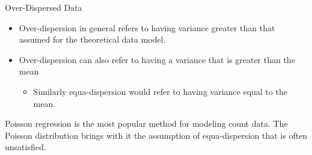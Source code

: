 \documentclass[
  ignorenonframetext,
]{beamer}
\providecommand{\tightlist}{%
  \setlength{\itemsep}{0pt}\setlength{\parskip}{0pt}}\usepackage{longtable,booktabs,array}
\begin{document}
\begin{frame}{Over-Dispersed Data}
\protect\hypertarget{over-dispersed-data}{}
\begin{itemize}
\tightlist
\item
  Over-dispersion in general refers to having variance greater than that
  assumed for the theoretical data model.\\
\item
  Over-dispersion can also refer to having a variance that is greater
  than the mean

  \begin{itemize}
  \tightlist
  \item
    Similarly equa-dispersion would refer to having variance equal to
    the mean.
  \end{itemize}
\end{itemize}

\begin{tcolorbox}[enhanced jigsaw, colbacktitle=quarto-callout-note-color!10!white, breakable, arc=.35mm, leftrule=.75mm, opacitybacktitle=0.6, titlerule=0mm, colframe=quarto-callout-note-color-frame, toptitle=1mm, left=2mm, bottomrule=.15mm, toprule=.15mm, coltitle=black, bottomtitle=1mm, title={Poisson regression}, rightrule=.15mm, opacityback=0, colback=white]

Poisson regression is the most popular method for modeling count data.
The Poisson distribution brings with it the assumption of
equa-dispersion that is often unsatisfied.

\end{tcolorbox}
\end{frame}
\end{document}

